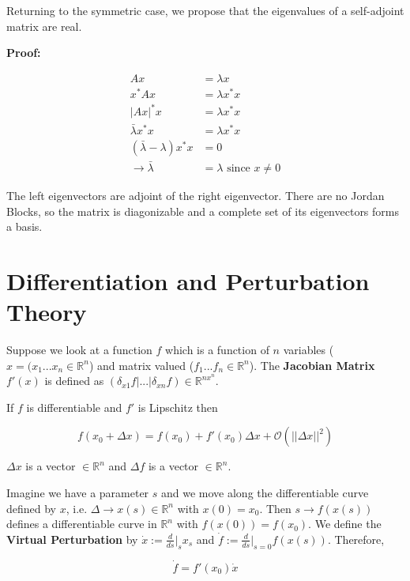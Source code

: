\documentclass{article}
\newcommand{\n}{\newline}
\begin{document}
\begin{flushleft}
	Returning to the symmetric case, we propose that the eigenvalues of a self-adjoint matrix are real.  
	
	\textbf{Proof:\n}
	
	\begin{align*}
		Ax&=\lambda x\\
		x^*Ax&=\lambda x^{*}x\\
		|Ax|^{*}x&=\lambda x^{*}x\\
		\bar{\lambda}x^{*}x&=\lambda x^{*}x\\
		(\bar{\lambda}-\lambda)x^{*}x&=0\\
		\rightarrow \bar{\lambda}&=\lambda \text{ since }x\neq0
	\end{align*}\n
	
	The left eigenvectors are adjoint of the right eigenvector.  There are no Jordan Blocks, so the matrix is diagonizable and a complete set of its eigenvectors forms a basis.
	
	\section{Differentiation and Perturbation Theory}
	
	Suppose we look at a function $f$ which is a function of $n$ variables ($x=(x_{1}...x_{n}\in\mathbb{R}^{n}$) and matrix valued ($f_{1}...f_{n}\in\mathbb{R}^{n}$).  The \textbf{Jacobian Matrix} $f'(x)$ is defined as $(\delta_{x1}f|...|\delta_{xn}f)\in\mathbb{R}^{nx^{n}}$.  \n
	
	If $f$ is differentiable and $f'$ is Lipschitz then
	
	\begin{equation}
		f(x_{0}+\Delta x)=f(x_{0})+f'(x_{0})\Delta x+\mathcal{O}(||\Delta x||^{2})
	\end{equation} 
	 
	 $\Delta x$ is a vector $\in\mathbb{R}^{n}$ and $\Delta f$ is a vector $\in\mathbb{R}^{n}$.\n
	
	Imagine we have a parameter $s$ and we move along the differentiable curve defined by $x$, i.e. $\Delta\rightarrow x(s) \in\mathbb{R}^{n}$ with $x(0)=x_{0}$.  Then $s\rightarrow f(x(s))$ defines a differentiable curve in $\mathbb{R}^{n}$ with $f(x(0))=f(x_{0})$.  We define the \textbf{Virtual Perturbation} by $\dot{x}:=\frac{d}{ds}|_{s}x_{s}$ and $\dot{f}:=\frac{d}{ds}|_{s=0}f(x(s))$.  Therefore, 
	
	\begin{equation}
		\dot{f}=f'(x_{0})\dot{x}
	\end{equation}
	

\end{flushleft}
\end{document}
